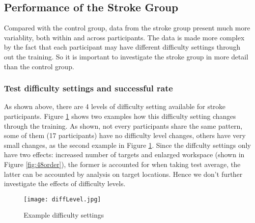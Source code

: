 \subsection{Performance of the Stroke Group}

Compared with the control group, data from the stroke group present much more variablity, both within and across participants. The data is made more complex by the fact that each participant may have different difficulty settings through out the training. So it is important to investigate the stroke group in more detail than the control group.

\subsubsection{Test difficulty settings and successful rate}

As shown above, there are 4 levels of difficulty setting available for stroke participants. Figure \ref{fig:diffLevel} shows two examples how this difficulty setting changes through the training. As shown, not every participants share the same pattern, some of them (17 participants) have no difficulty level changes, others have very small changes, as the second example in Figure \ref{fig:diffLevel}. Since the diffculty settings only have two effects: increased number of targets and enlarged workspace (shown in Figure \ref{fig:48order}), the former is accounted for when taking test average, the latter can be accounted by analysis on target locations. Hence we don't further investigate the effects of difficulty levels.

\begin{figure}
	\texttt{[image: diffLevel.jpg]}
	\centering
	\caption{Example difficulty settings}
	\medskip
	\small 
	\label{fig:diffLevel}
\end{figure}




















































